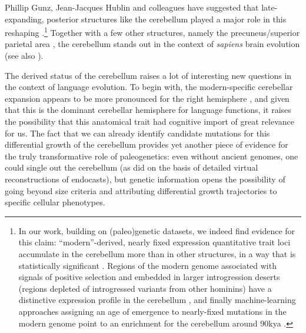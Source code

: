 Phillip Gunz, Jean-Jacques Hublin and colleagues have suggested that late-expanding, posterior structures like the cerebellum played a major role in this reshaping \citep{hublin2015brain}.\footnote{In our work, building on (paleo)genetic datasets, we indeed find evidence for this claim: ``modern''-derived, nearly fixed expression quantitative trait loci accumulate in the cerebellum more than in other structures, in a way that is statistically significant \citep{andirko2019derived}. Regions of the modern genome associated with signals of positive selection and embedded in larger introgression deserts (regions depleted of introgressed variants from other hominins) have a distinctive expression profile in the cerebellum \citep{raul}, and finally machine-learning approaches assigning an age of emergence to nearly-fixed mutations in the modern genome point to an enrichment for the cerebellum around 90kya \citep{andirko2021fine}.} Together with a few other structures, namely the precuneus/superior parietal area \citep{pereira2020morphometric,bruner2021evolving}, the cerebellum stands out in the context of \textit{sapiens} brain evolution (see also \cite{dumas2021systematic,weiss2021cis,gunz2019neandertal}).

The derived status of the cerebellum raises a lot of interesting new questions in the context of language evolution. To begin with, the modern-specific cerebellar expansion appears to be more pronounced for the right hemisphere \citep{kochiyama2018reconstructing}, and given that this is the dominant cerebellar hemisphere for language functions, it raises the possibility that this anatomical trait had cognitive import of great relevance for us. The fact that we can already identify candidate mutations for this differential growth of the cerebellum provides yet another piece of evidence for the truly transformative role of paleogenetics: even without ancient genomes, one could single out the cerebellum (as \cite{gunz2010brain} did on the basis of detailed virtual reconstructions of endocasts), but genetic information opens the possibility of going beyond size criteria and attributing differential growth trajectories to specific cellular phenotypes. 

